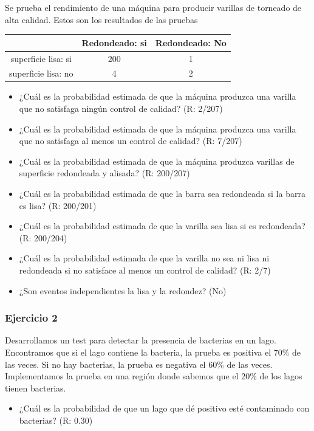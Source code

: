 \documentclass[
]{book}
\providecommand{\tightlist}{%
  \setlength{\itemsep}{0pt}\setlength{\parskip}{0pt}}
\begin{document}
Se prueba el rendimiento de una máquina para producir varillas de torneado de alta calidad. Estos son los resultados de las pruebas

\begin{longtable}[]{@{}ccc@{}}
\toprule\noalign{}
& Redondeado: si & Redondeado: No \\
\midrule\noalign{}
\endhead
\bottomrule\noalign{}
\endlastfoot
superficie lisa: si & 200 & 1 \\
superficie lisa: no & 4 & 2 \\
\end{longtable}

\begin{itemize}
\item
  ¿Cuál es la probabilidad estimada de que la máquina produzca una varilla que no satisfaga ningún control de calidad? (R: 2/207)
\item
  ¿Cuál es la probabilidad estimada de que la máquina produzca una varilla que no satisfaga al menos un control de calidad? (R: 7/207)
\item
  ¿Cuál es la probabilidad estimada de que la máquina produzca varillas de superficie redondeada y alisada? (R: 200/207)
\item
  ¿Cuál es la probabilidad estimada de que la barra sea redondeada si la barra es lisa? (R: 200/201)
\item
  ¿Cuál es la probabilidad estimada de que la varilla sea lisa si es redondeada? (R: 200/204)
\item
  ¿Cuál es la probabilidad estimada de que la varilla no sea ni lisa ni redondeada si no satisface al menos un control de calidad? (R: 2/7)
\item
  ¿Son eventos independientes la lisa y la redondez? (No)
\end{itemize}

\hypertarget{ejercicio-2-1}{%
\subsubsection{Ejercicio 2}\label{ejercicio-2-1}}

Desarrollamos un test para detectar la presencia de bacterias en un lago. Encontramos que si el lago contiene la bacteria, la prueba es positiva el 70\% de las veces. Si no hay bacterias, la prueba es negativa el 60\% de las veces. Implementamos la prueba en una región donde sabemos que el 20\% de los lagos tienen bacterias.

\begin{itemize}
\tightlist
\item
  ¿Cuál es la probabilidad de que un lago que dé positivo esté contaminado con bacterias? (R: 0.30)
\end{itemize}
\end{document}
